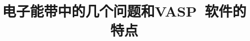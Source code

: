 \documentclass{article}      %
\begin{document}
\graphicspath{{/media/Windows_7/Documents/Presentation_Beamer/Figures/}}
%
\renewcommand{\abstractname}{\small{\CJKfamily{hei} 摘\quad 要}} %
\renewcommand{\refname}{\centering\CJKfamily{hei} 参考文献}
\renewcommand{\figurename}{{\bf Fig}.}
\renewcommand{\tablename}{{\bf Tab}.}

\makeatletter
\long{}
\makeatother

\newcommand{\keywords}[1]{{\hspace{0\ccwd}\small{\CJKfamily{hei} 关键词:}{\hspace{2ex}{#1}}\bigskip}}



\title{电子能带中的几个问题和\rm{VASP~}软件的特点}

\author{
\small
\small
}
\date{}					%
\maketitle
\end{document}
